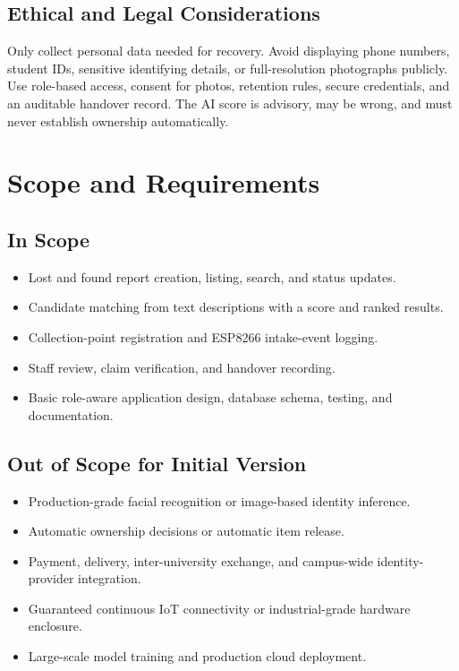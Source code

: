 \documentclass[12pt,a4paper]{report}
\begin{document}
\section{Ethical and Legal Considerations}
Only collect personal data needed for recovery. Avoid displaying phone numbers, student IDs, sensitive identifying details, or full-resolution photographs publicly. Use role-based access, consent for photos, retention rules, secure credentials, and an auditable handover record. The AI score is advisory, may be wrong, and must never establish ownership automatically.

\chapter{Scope and Requirements}
\section{In Scope}
\begin{itemize}
\item Lost and found report creation, listing, search, and status updates.
\item Candidate matching from text descriptions with a score and ranked results.
\item Collection-point registration and ESP8266 intake-event logging.
\item Staff review, claim verification, and handover recording.
\item Basic role-aware application design, database schema, testing, and documentation.
\end{itemize}

\section{Out of Scope for Initial Version}
\begin{itemize}
\item Production-grade facial recognition or image-based identity inference.
\item Automatic ownership decisions or automatic item release.
\item Payment, delivery, inter-university exchange, and campus-wide identity-provider integration.
\item Guaranteed continuous IoT connectivity or industrial-grade hardware enclosure.
\item Large-scale model training and production cloud deployment.
\end{itemize}
\end{document}
